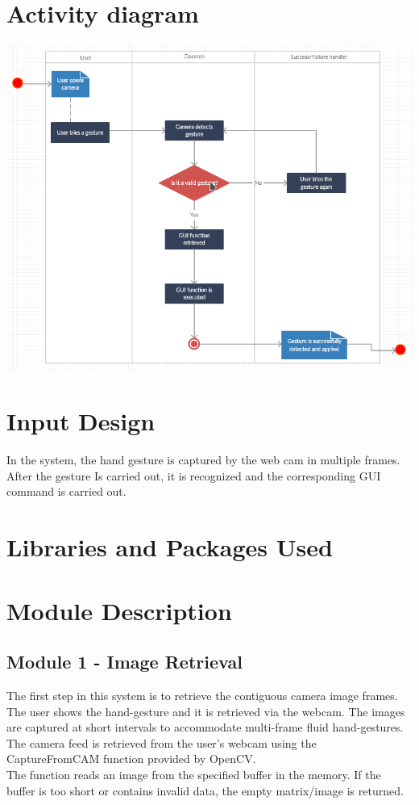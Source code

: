 \documentclass[11pt]{report}
\begin{document}
\section{Activity diagram}
\begin{center}
    \includegraphics[scale=0.8]{activitydiagram.png}
\end{center}

\section{Input Design}
    In the system, the hand gesture is captured by the web cam in multiple frames. After the gesture Is
    carried out, it is recognized and the corresponding GUI command is carried out.

\section{Libraries and Packages Used}


\section{Module Description}

\subsection{Module 1 - Image Retrieval}
The first step in this system is to retrieve the contiguous camera image frames. The user shows the hand-gesture 
and it is retrieved via the webcam. The images are captured at short intervals to accommodate multi-frame fluid hand-gestures.
\\
The camera feed is retrieved from the user's webcam using the CaptureFromCAM function provided by OpenCV.
\\
The function reads an image from the specified buffer in the memory. If the buffer is too short or contains invalid data, the empty matrix/image is returned.
\end{document}
